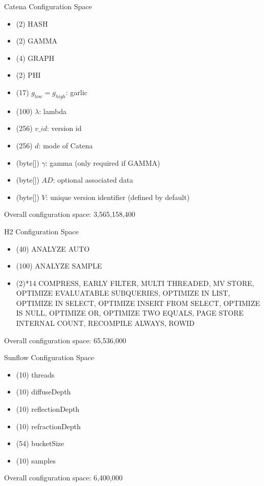 \documentclass[11pt,aspectratio=169]{beamer}
\begin{document}
\begin{frame}{Catena Configuration Space}
  \begin{itemize}
    \item (2) HASH
    \item (2) GAMMA
    \item (4) GRAPH
    \item (2) PHI

    \item (17) $g_{low}=g_{high}$: garlic
    \item (100) $\lambda$: lambda
    \item (256) $v\_id$: version id
    \item (256) $d$: mode of Catena
  
    \item (byte[]) $\gamma$: gamma (only required if GAMMA)
    \item (byte[]) $AD$: optional associated data
    \item (byte[]) $V$: unique version identifier (defined by default)
  \end{itemize}
  Overall configuration space: 3,565,158,400
\end{frame}

\begin{frame}{H2 Configuration Space}
  \begin{itemize}
    \item (40) ANALYZE AUTO
    \item (100) ANALYZE SAMPLE
    \item (2)*14 COMPRESS, EARLY FILTER, MULTI THREADED, MV STORE, OPTIMIZE EVALUATABLE SUBQUERIES, OPTIMIZE IN LIST, OPTIMIZE IN SELECT, OPTIMIZE INSERT FROM SELECT, OPTIMIZE IS NULL, OPTIMIZE OR, OPTIMIZE TWO EQUALS, PAGE STORE INTERNAL COUNT, RECOMPILE ALWAYS, ROWID
  \end{itemize}
  Overall configuration space: 65,536,000
\end{frame}

\begin{frame}{Sunflow Configuration Space}
  \begin{itemize}
    \item (10) threads
    \item (10) diffuseDepth
    \item (10) reflectionDepth
    \item (10) refractionDepth
    \item (54) bucketSize
    \item (10) samples
  \end{itemize}
  Overall configuration space: 6,400,000
\end{frame}

\appendix
\end{document}
